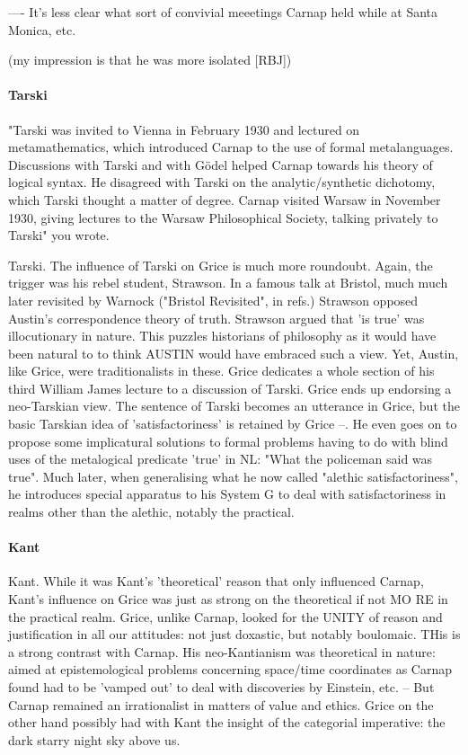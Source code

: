 \documentclass[10pt,titlepage]{book}
\begin{document}
---- It's less clear what sort of convivial meeetings Carnap held while at  
Santa Monica, etc.

(my impression is that he was more isolated [RBJ])

\paragraph{Tarski}

"Tarski was invited to Vienna in February 1930 and lectured on  
metamathematics, which introduced Carnap to the use of formal metalanguages.  
Discussions with Tarski and with Gödel helped Carnap towards his theory of  logical 
syntax. He disagreed with Tarski on the analytic/synthetic dichotomy,  which 
Tarski thought a matter of degree. Carnap visited Warsaw in November 1930,  
giving lectures to the Warsaw Philosophical Society, talking privately to  
Tarski" you wrote.
  
Tarski. The influence of Tarski on Grice is much more roundoubt. Again, the 
 trigger was his rebel student, Strawson. In a famous talk at Bristol,  
much much later revisited by Warnock ("Bristol Revisited", in refs.) Strawson  
opposed Austin's correspondence theory of truth. Strawson argued that 'is  
true' was illocutionary in nature. This puzzles historians of philosophy as 
it  would have been natural to to think AUSTIN would have embraced such a 
view.  Yet, Austin, like Grice, were traditionalists in these. Grice dedicates 
a  whole section of his third William James lecture to a discussion of 
Tarski.  Grice ends up endorsing a neo-Tarskian view. The sentence of Tarski 
becomes an  utterance in Grice, but the basic Tarskian idea of 
'satisfactoriness' is  retained by Grice --. He even goes on to propose some implicatural 
solutions to  formal problems having to do with blind uses of the metalogical 
predicate  'true' in NL: "What the policeman said was true". Much later, when 
 generalising what he now called "alethic satisfactoriness", he introduces  
special apparatus to his System G to deal with satisfactoriness in realms 
other  than the alethic, notably the practical. 
 
\paragraph{Kant}
 
Kant. While it was Kant's 'theoretical' reason that only influenced Carnap, 
 Kant's influence on Grice was just as strong on the theoretical if not MO
RE in  the practical realm. Grice, unlike Carnap, looked for the UNITY of 
reason  and justification in all our attitudes: not just doxastic, but notably  
boulomaic. THis is a strong contrast with Carnap. His neo-Kantianism was  
theoretical in nature: aimed at epistemological problems concerning 
space/time  coordinates as Carnap found had to be 'vamped out' to deal with 
discoveries  by Einstein, etc. -- But Carnap remained an irrationalist in matters of  
value and ethics. Grice on the other hand possibly had with Kant the  
insight of the categorial imperative: the dark starry night sky above us.
 
\end{document}
